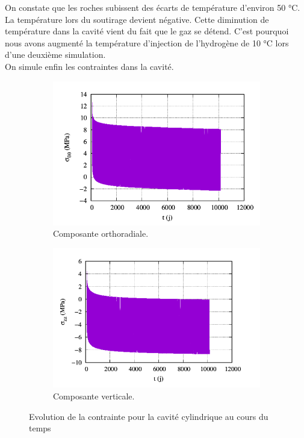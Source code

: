 \documentclass[11pt,french,a4paper]{article}
\begin{document}
On constate que les roches subissent des écarts de température d’environ 50 °C. La température lors du soutirage devient négative. Cette diminution de température dans la cavité vient du fait que le gaz se détend. C’est pourquoi nous avons augmenté la température d’injection de l’hydrogène de 10 °C lors d’une deuxième simulation. \\

On simule enfin les contraintes dans la cavité. 

\begin{figure}[h!]
  \centering
  \begin{subfigure}[b]{0.4\linewidth}
    \includegraphics[width=\linewidth]{image/chap2/Cavité minée GH2 P2I contrainte teta teta au cours temps.png}
    \caption{Composante orthoradiale.}
  \end{subfigure}
  \begin{subfigure}[b]{0.43\linewidth}
    \includegraphics[width=\linewidth]{image/chap2/Cavité minée GH2 P2I contrainte zz au cours temps.png}
    \caption{Composante verticale.}
  \end{subfigure}
  \caption{Evolution de la contrainte pour la cavité cylindrique au cours du temps}
  \label{fig:contrainte}
\end{figure}
\end{document}
